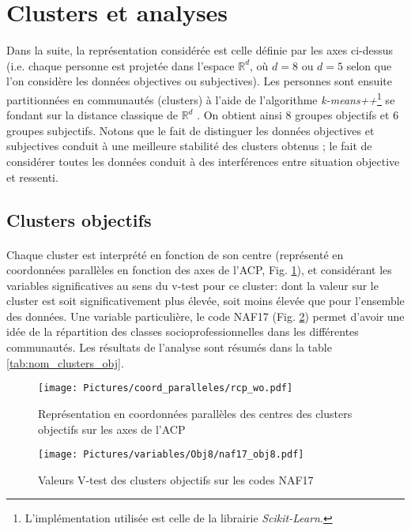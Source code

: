 \documentclass[11pt,fleqn,a4paper,openany,frenchb]{book} %
\begin{document}
\section{Clusters et analyses}

Dans la suite, la représentation considérée est celle définie par les axes ci-dessus (i.e. chaque personne est projetée dans l'espace $\mathbb{R}^d$, où $d=8$ ou $d=5$ selon que l'on considère les données objectives ou subjectives). Les personnes sont ensuite partitionnées en communautés (clusters) à l'aide de l'algorithme \textit{k-means++}\footnote{L'implémentation utilisée est celle de la librairie \textit{Scikit-Learn}.} se fondant sur la distance classique de $\mathbb{R}^d$ \cite{arthur2007k}.  On obtient ainsi 8 groupes objectifs et 6 groupes subjectifs. Notons que le fait de distinguer les données objectives et subjectives conduit à une meilleure stabilité des clusters obtenus ; le fait de considérer toutes les données conduit à des interférences entre situation objective et ressenti. 

\subsection{Clusters objectifs}
\paragraph{}
Chaque cluster est interprété en fonction de son centre (représenté en coordonnées parallèles en fonction des  axes de l'ACP, Fig. \ref{fig:CPobj}), et considérant les variables significatives au sens du v-test pour ce cluster: dont la valeur sur le cluster est soit significativement plus élevée, soit moins élevée que pour l'ensemble des données. Une variable particulière, le code NAF17 (Fig. \ref{fig:nafobj}) permet d'avoir une idée de la répartition des classes socioprofessionnelles dans les différentes communautés. Les résultats de l'analyse sont résumés dans la table \ref{tab:nom_clusters_obj}.


\begin{figure}[!h]
\centering
  \texttt{[image: Pictures/coord\_paralleles/rcp\_wo.pdf]}
\caption{Représentation en coordonnées parallèles des centres des clusters objectifs sur les axes de l'ACP}
\label{fig:CPobj}
\end{figure}

\begin{figure}[!h]
\centering
  \texttt{[image: Pictures/variables/Obj8/naf17\_obj8.pdf]}
\caption{Valeurs V-test des clusters objectifs sur les codes NAF17}
\label{fig:nafobj}
\end{figure}
\end{document}
